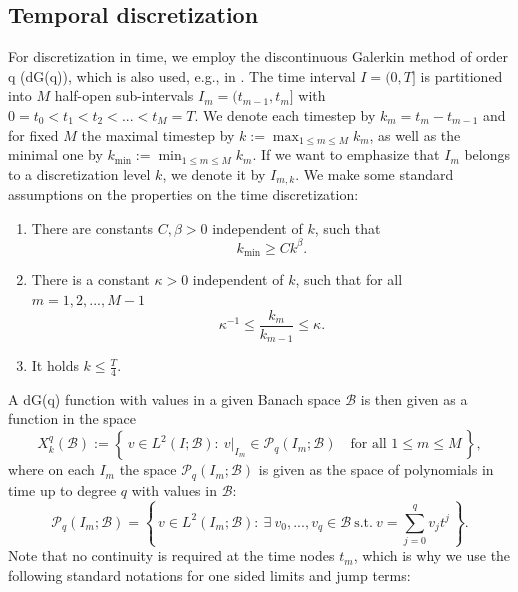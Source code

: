 \documentclass{m2an}
\newcommand{\MathSet}[1]{\left\lbrace \, #1 \, \right\rbrace}
\begin{document}
\subsection{Temporal discretization}
For discretization in time, we employ the discontinuous Galerkin method of order q (dG(q)),
which is also used, e.g., in \cite{behringer_fully_2022,Chrysafinos2010,eriksson_time_1985}.
The time interval $I = (0,T]$ is partitioned into $M$ half-open sub-intervals $I_m = (t_{m-1},t_m]$ with
$0=t_0 < t_1 < t_2 < ... < t_M = T$. We denote each timestep by $k_m = t_m - t_{m-1}$ and for fixed
$M$ the maximal timestep by $k:= \max_{1\le m \le M} k_m$, as well as the minimal one by 
$k_{\min} := \min_{1\le m \le M} k_m$.
If we want to emphasize that $I_m$ belongs to a discretization level $k$, we denote it by $I_{m,k}$.
We make some standard assumptions on the properties on the time discretization:
\begin{enumerate}
  \item There are constants $C,\beta > 0$ independent of $k$, such that 
    \begin{equation*}
      k_{\min} \ge C k^\beta.
    \end{equation*}
  \item There is a constant $\kappa > 0$ independent of $k$, such that for all $m=1,2,...,M-1$
    \begin{equation*}
      \kappa^{-1} \le \frac{k_m}{k_{m-1}} \le \kappa.
    \end{equation*}
  \item It holds $k \le \frac{T}{4}$.
\end{enumerate}
A dG(q) function with values in a given Banach space $\mathcal B$ is then given as a function
in the space
\begin{equation*}
  X^q_k(\mathcal B):= 
  \MathSet{ v \in L^2(I;\mathcal B): \  
  v|_{I_m} \in \mathcal P_q(I_m;\mathcal B) \quad \text{for all } 1 \le m \le M },
\end{equation*}
where on each $I_m$ the space $\mathcal P_q(I_m;\mathcal B)$ is given as the space of polynomials 
in time up to degree $q$ with values in $\mathcal B$:
\begin{equation*}
  \mathcal P_q(I_m;\mathcal B) = \MathSet{ v \in L^2(I_m;\mathcal B) : \
  \exists \ v_0,...,v_q \in \mathcal B \ \text{s.t.} \ v = \sum_{j=0}^q v_j t^j }.
\end{equation*}
Note that no continuity is required at the time nodes $t_m$, which is why
we use the following standard notations for one sided limits and jump terms:
\end{document}
